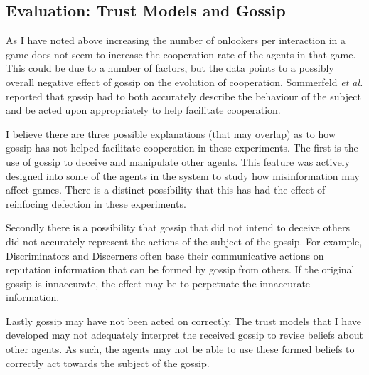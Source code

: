 \documentclass[]{final_report}
\begin{document}
\subsection{Evaluation: Trust Models and Gossip}
As I have noted above increasing the number of onlookers per interaction in a game does not seem to increase the cooperation rate of the agents in that game. This could be due to a number of factors, but the data points to a possibly overall negative effect of gossip on the evolution of cooperation. Sommerfeld \textit{et al.} reported that gossip had to both accurately describe the behaviour of the subject and be acted upon appropriately to help facilitate cooperation.\par 
I believe there are three possible explanations (that may overlap) as to how gossip has not helped facilitate cooperation in these experiments. The first is the use of gossip to deceive and manipulate other agents. This feature was actively designed into some of the agents in the system to study how misinformation may affect games. There is a distinct possibility that this has had the effect of reinfocing defection in these experiments.\par 
Secondly there is a possibility that gossip that did not intend to deceive others did not accurately represent the actions of the subject of the gossip. For example, Discriminators and Discerners often base their communicative actions on reputation information that can be formed by gossip from others. If the original gossip is innaccurate, the effect may be to perpetuate the innaccurate information.\par 
Lastly gossip may have not been acted on correctly. The trust models that I have developed may not adequately interpret the received gossip to revise beliefs about other agents. As such, the agents may not be able to use these formed beliefs to correctly act towards the subject of the gossip.
\end{document}
